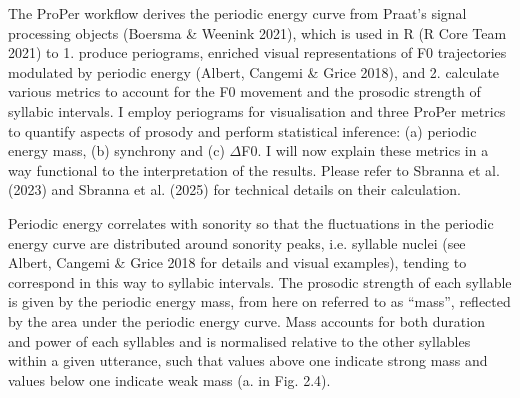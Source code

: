 \begin{styleStandard}
The ProPer workflow derives the periodic energy curve from Praat’s signal processing objects (Boersma \& Weenink 2021), which is used in R (R Core Team 2021) to 1. produce periograms, enriched visual representations of F0 trajectories modulated by periodic energy (Albert, Cangemi \& Grice 2018), and 2. calculate various metrics to account for the F0 movement and the prosodic strength of syllabic intervals. I employ periograms for visualisation and three ProPer metrics to quantify aspects of prosody and perform statistical inference: (a) periodic energy mass, (b) synchrony and (c) ${\Delta}$F0. I will now explain these metrics in a way functional to the interpretation of the results. Please refer to Sbranna et al. (2023) and Sbranna et al. (2025) for technical details on their calculation.
\end{styleStandard}

\begin{styleStandard}
Periodic energy correlates with sonority so that the fluctuations in the periodic energy curve are distributed around sonority peaks, i.e. syllable nuclei (see Albert, Cangemi \& Grice 2018 for details and visual examples), tending to correspond in this way to syllabic intervals. The prosodic strength of each syllable is given by the periodic energy mass, from here on referred to as “mass”, reflected by the area under the periodic energy curve. Mass accounts for both duration and power of each syllables and is normalised relative to the other syllables within a given utterance, such that values above one indicate strong mass and values below one indicate weak mass (a. in Fig. 2.4).
\end{styleStandard}

